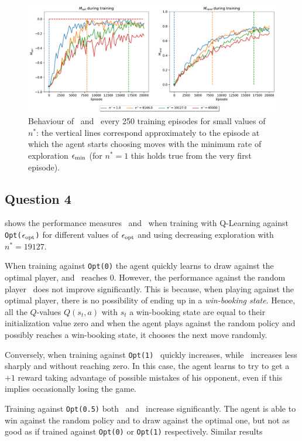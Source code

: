 \documentclass[10pt]{IEEEtran}
\begin{document}
\begin{figure}[H]
    \centering
    \includegraphics[width=\linewidth]{code/figures/performance_n_star.pdf}
    \caption{Behaviour of \mopt\  and \mrand\  every 250 training episodes for small values of $n^{*}$:  the vertical lines correspond approximately to the episode at which the agent starts choosing moves with the minimum rate of exploration $\epsilon_{\text{min}}$ (for $n^{*} = 1$ this holds true from the very first episode).}
    \label{plot_question3}
\end{figure}


\subsection*{Question 4}
 shows the performance measures \mopt\  and \mrand\  when training with Q-Learning against \texttt{Opt($\epsilon_{\text{opt}}$)} for different values of $\epsilon_{\text{opt}}$ and using decreasing exploration with $n^{*} = 19127$.

When training against \texttt{Opt(0)} the agent quickly learns to draw against the optimal player, and \mopt\  reaches 0. However, the performance against the random player \mrand\  does not improve significantly. This is because, when playing against the optimal player, there is no possibility of ending up in a \emph{win-booking state}. Hence, all the $Q$-values $Q(s_t, a)$ with $s_t$ a win-booking state are equal to their initialization value zero and when the agent plays against the random policy and possibly reaches a win-booking state, it chooses the next move randomly. 

Conversely, when training against \texttt{Opt(1)} \mrand\  quickly increases, while \mopt\  increases less sharply and without reaching zero. In this case, the agent learns to try to get a $+1$ reward taking advantage of possible mistakes of his opponent, even if this implies occasionally losing the game. 

Training against \texttt{Opt(0.5)} both \mopt\  and \mrand\  increase significantly. The agent is able to win against the random policy and to draw against the optimal one, but not as good as if trained against \texttt{Opt(0)} or \texttt{Opt(1)} respectively. Similar results
\end{document}
